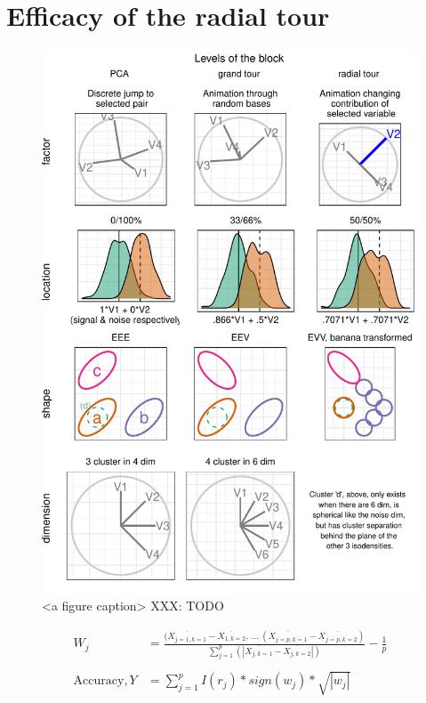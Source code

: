\documentclass{monashthesis}
\begin{document}
\hypertarget{ch:efficacy_radial_tour}{%
\chapter{Efficacy of the radial tour}\label{ch:efficacy_radial_tour}}

\begin{figure}

{\centering \includegraphics[width=1\linewidth,]{./figures_from_script/ch4_fig2_exp_factors} 

}

\caption{<a figure caption> XXX: TODO}\label{fig:ch4fig2}
\end{figure}

\begin{align*}
W_{j} &=\frac
{(\overline{X_{j=1, k=1}} - \overline{X_{1, k=2}}, ~...~
(\overline{X_{j=p, k=1}} - \overline{X_{j=p, k=2}})}
{\sum_{j=1}^{p}(|\overline{X_{j,k=1}} - \overline{X_{j,k=2}}|)}
- \frac{1}{p} \\
\\
\text{Accuracy}, Y &= \sum_{j=1}^{p}I(r_j) * sign(w_j) * \sqrt{|w_j|}  \\
\end{align*}
\end{document}
